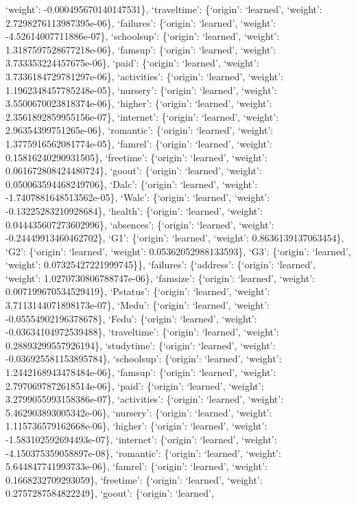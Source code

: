 \documentclass[
]{article}
\begin{document}
`weight': -0.000495670140147531\}, `traveltime': \{`origin': `learned',
`weight': 2.7298276113987395e-06\}, `failures': \{`origin': `learned',
`weight': -4.52614007711886e-07\}, `schoolsup': \{`origin': `learned',
`weight': 1.3187597528677218e-06\}, `famsup': \{`origin': `learned',
`weight': 3.733353224457675e-06\}, `paid': \{`origin': `learned',
`weight': 3.7336184729781297e-06\}, `activities': \{`origin': `learned',
`weight': 1.1962348457785248e-05\}, `nursery': \{`origin': `learned',
`weight': 3.5500670023818374e-06\}, `higher': \{`origin': `learned',
`weight': 2.3561892859955156e-07\}, `internet': \{`origin': `learned',
`weight': 2.96354399751265e-06\}, `romantic': \{`origin': `learned',
`weight': 1.3775916562081774e-05\}, `famrel': \{`origin': `learned',
`weight': 0.15816240290931505\}, `freetime': \{`origin': `learned',
`weight': 0.061672808424480724\}, `goout': \{`origin': `learned',
`weight': 0.050063594468249706\}, `Dalc': \{`origin': `learned',
`weight': -1.7407881648513562e-05\}, `Walc': \{`origin': `learned',
`weight': -0.13225283210928684\}, `health': \{`origin': `learned',
`weight': 0.044435607273602996\}, `absences': \{`origin': `learned',
`weight': -0.24449913460462702\}, `G1': \{`origin': `learned', `weight':
0.8636139137063454\}, `G2': \{`origin': `learned', `weight':
0.05362052988133593\}, `G3': \{`origin': `learned', `weight':
0.07325427221999745\}\}, `failures': \{`address': \{`origin': `learned',
`weight': 1.0270730806788747e-06\}, `famsize': \{`origin': `learned',
`weight': 0.007199670534529419\}, `Pstatus': \{`origin': `learned',
`weight': 3.7113144071898173e-07\}, `Medu': \{`origin': `learned',
`weight': -0.05554902196378678\}, `Fedu': \{`origin': `learned',
`weight': -0.03634104972539488\}, `traveltime': \{`origin': `learned',
`weight': 0.28893299557926194\}, `studytime': \{`origin': `learned',
`weight': -0.036925581153895784\}, `schoolsup': \{`origin': `learned',
`weight': 1.2442168943478484e-06\}, `famsup': \{`origin': `learned',
`weight': 2.7970697872618514e-06\}, `paid': \{`origin': `learned',
`weight': 3.2799055993158386e-07\}, `activities': \{`origin': `learned',
`weight': 5.462903893005342e-06\}, `nursery': \{`origin': `learned',
`weight': 1.115736579162668e-06\}, `higher': \{`origin': `learned',
`weight': -1.583102592694493e-07\}, `internet': \{`origin': `learned',
`weight': -4.150375359058897e-08\}, `romantic': \{`origin': `learned',
`weight': 5.644847741993733e-06\}, `famrel': \{`origin': `learned',
`weight': 0.1668232709293059\}, `freetime': \{`origin': `learned',
`weight': 0.2757287584822249\}, `goout': \{`origin': `learned',
\end{document}
